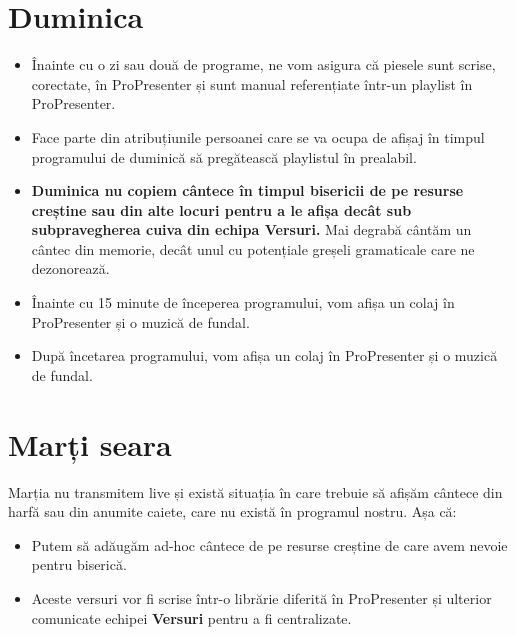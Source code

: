 \documentclass[epjST]{svjour}
\begin{document}
  \section{Duminica}
  \label{sec:3}
  \begin{itemize}
    \item Înainte cu o zi sau două de programe, ne vom asigura că piesele sunt
      scrise, corectate, în ProPresenter și sunt manual referențiate într-un
      playlist în ProPresenter.

    \item Face parte din atribuțiunile persoanei care se va ocupa de afișaj în timpul
      programului de duminică să pregătească playlistul în prealabil.

    \item \textbf{Duminica nu copiem cântece în timpul bisericii de pe resurse creștine
      sau din alte locuri pentru a le afișa decât sub subpravegherea cuiva din echipa
      \textbf{Versuri}.} Mai degrabă cântăm un cântec din memorie, decât unul cu
      potențiale greșeli gramaticale care ne dezonorează.

    \item Înainte cu 15 minute de începerea programului, vom afișa un colaj în
      ProPresenter și o muzică de fundal.

    \item După încetarea programului, vom afișa un colaj în ProPresenter și o
      muzică de fundal.
  \end{itemize}

  \section{Marți seara}
  \label{sec:6} Marția nu transmitem live și există situația în care trebuie să afișăm
  cântece din harfă sau din anumite caiete, care nu există în programul nostru. Așa
  că:
  \begin{itemize}
    \item Putem să adăugăm ad-hoc cântece de pe resurse creștine de care avem nevoie
      pentru biserică.

    \item Aceste versuri vor fi scrise într-o librărie diferită în ProPresenter și
      ulterior comunicate echipei \textbf{Versuri} pentru a fi centralizate.
  \end{itemize}
\end{document}
